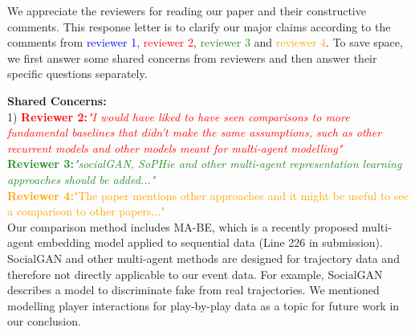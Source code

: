 \documentclass{article}
\begin{document}
We appreciate the reviewers for reading our paper and their constructive comments. This response letter is to clarify our major claims according to the comments from \textcolor{Blue}{reviewer 1}, \textcolor{Red}{reviewer 2}, \textcolor{ForestGreen}{reviewer 3} and \textcolor{orange}{reviewer 4}. To save space, we first answer some shared concerns from reviewers and then answer their specific questions separately. 

{\bf Shared Concerns:}\\
1) \textcolor{red}{\bf Reviewer 2:}\textcolor{red}{\it  "I would have liked to have seen comparisons to more fundamental baselines that didn't make the same assumptions, such as other recurrent models and other models meant for multi-agent modelling"}\\
\textcolor{ForestGreen}{\bf Reviewer 3:}\textcolor{ForestGreen}{\it "socialGAN, SoPHie and other multi-agent representation learning approaches should be added..."}\\
\textcolor{orange}{\bf Reviewer 4:}\textcolor{orange}{"The paper mentions other approaches and it might be useful to see a comparison to other papers..."}\\ 
Our comparison method includes MA-BE, which is a recently proposed multi-agent embedding model applied to sequential data  (Line 226 in submission). SocialGAN and other multi-agent methods are designed for trajectory data and therefore not directly applicable to our event data. For example, SocialGAN describes a model to discriminate fake from real trajectories. %
We mentioned modelling player interactions for play-by-play data as a topic for future work in our conclusion.
\end{document}
